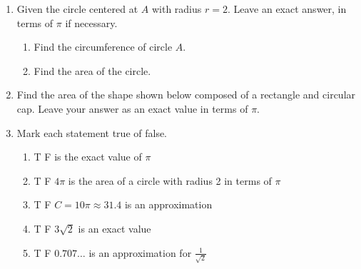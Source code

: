 \begin{enumerate}
\item Given the circle centered at $A$ with radius $r=2$. Leave an exact answer, in terms of $\pi$ if necessary.
  \begin{multicols}{2}
    \begin{enumerate}
      \item Find the circumference of circle $A$. %
      \item Find the area of the circle.\vspace{2cm}
    \end{enumerate}
    \begin{flushright}
  \end{flushright}
  \end{multicols}

\item Find the area of the shape shown below composed of a rectangle and circular cap. Leave your answer as an exact value in terms of $\pi$.
\begin{flushright}
\end{flushright}

\item Mark each statement true of false.
\begin{enumerate}[itemsep=0.3cm]
  \item T \quad F  is the exact value of $\pi$
  \item T \quad F \qquad $4\pi$ is the area of a circle with radius 2 in terms of $\pi$
  \item T \quad F \qquad $C = 10\pi \approx 31.4$ is an approximation
  \item T \quad F \qquad $3\sqrt{2}$ is an exact value
  \item T \quad F \qquad $0.707\dots$ is an approximation for $\displaystyle \frac{1}{\sqrt{2}}$
\end{enumerate}


\end{enumerate}
